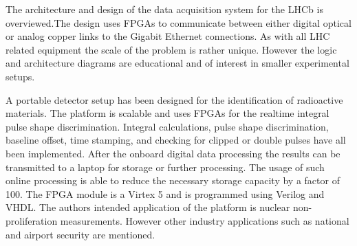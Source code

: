 \documentclass[12pt]{article}
\begin{document}
\begin{doublespacing}
{\large\textbf{\cite{Haefeli2006119}}}

The architecture and design of the data acquisition system for the LHCb is overviewed.The design uses FPGAs to communicate between either digital optical or analog copper links to the Gigabit Ethernet connections. As with all LHC related equipment the scale of the problem is rather unique. However the logic and architecture diagrams are educational and of interest in smaller experimental setups.
\\[20pt]


{\large\textbf{\cite{Schiffer2011491}}}

A portable detector setup has been designed for the identification of radioactive materials. The platform is scalable and uses FPGAs for the realtime integral pulse shape discrimination. Integral calculations, pulse shape discrimination, baseline offset, time stamping, and checking for clipped or double pulses have all been implemented. After the onboard digital data processing the results can be transmitted to a laptop for storage or further processing. The usage of such online processing is able to reduce the necessary storage capacity by a factor of 100. The FPGA module is a Virtex 5 and is programmed using Verilog and VHDL. The authors intended application of the platform is nuclear non-proliferation measurements. However other industry applications such as national and airport security are mentioned.
\\[20pt]


\end{doublespacing}



\end{document}
